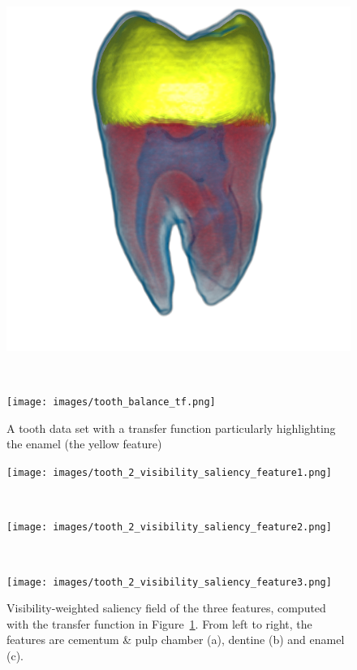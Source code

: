 \begin{figure}
	\centering
	\begin{minipage}{.6\textwidth}
		\includegraphics[width=1\linewidth]{images/tooth_balance_gpu.png}
		\subcaption{}
	\end{minipage}~
	\begin{minipage}{.3\textwidth}
		\texttt{[image: images/tooth\_balance\_tf.png]}
		\subcaption{}
	\end{minipage}
	\caption{A tooth data set with a transfer function particularly highlighting the enamel (the yellow feature)}
	\label{fig:tooth_2}
\end{figure}

\begin{figure}
	\centering
	\begin{minipage}{.3\textwidth}
		\texttt{[image: images/tooth\_2\_visibility\_saliency\_feature1.png]}
		\subcaption{}
	\end{minipage}~
	\begin{minipage}{.3\textwidth}
		\texttt{[image: images/tooth\_2\_visibility\_saliency\_feature2.png]}
		\subcaption{}
	\end{minipage}~
	\begin{minipage}{.3\textwidth}
		\texttt{[image: images/tooth\_2\_visibility\_saliency\_feature3.png]}
		\subcaption{}
	\end{minipage}
	\caption[Visibility-weighted saliency field of the three features]{Visibility-weighted saliency field of the three features, computed with the transfer function in Figure~\ref{fig:tooth_2}. From left to right, the features are cementum \& pulp chamber (a), dentine (b) and enamel (c).}
	\label{fig:tooth_saliency_field_2}
\end{figure}

